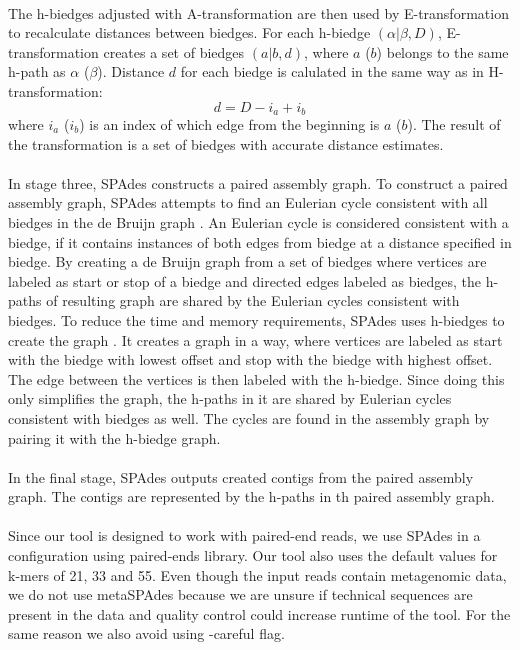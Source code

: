 \paragraph*{}
The h-biedges adjusted with A-transformation are then used by E-transformation to recalculate distances between biedges. For each h-biedge $(\alpha|\beta,D)$, E-transformation creates a set of biedges $(a|b,d)$, where $a$ ($b$) belongs to the same h-path as $\alpha$ ($\beta$). Distance $d$ for each biedge is calulated in the same way as in H-transformation:
\[ d = D - i_{a} + i_{b} \]
where $i_{a}$ ($i_{b}$) is an index of which edge from the beginning is $a$ ($b$). The result of the transformation is a set of biedges with accurate distance estimates.
\paragraph*{}
In stage three, SPAdes constructs a paired assembly graph. To construct a paired assembly graph, SPAdes attempts to find an Eulerian cycle consistent with all biedges in the de Bruijn graph \cite{bankevich2012spades}. An Eulerian cycle is considered consistent with a biedge, if it contains instances of both edges from biedge at a distance specified in biedge. By creating a de Bruijn graph from a set of biedges where vertices are labeled as start or stop of a biedge and directed edges labeled as biedges, the h-paths of resulting graph are shared by the Eulerian cycles consistent with biedges. To reduce the time and memory requirements, SPAdes uses h-biedges to create the graph \cite{bankevich2012spades}. It creates a graph in a way, where vertices are labeled as start with the biedge with lowest offset and stop with the biedge with highest offset. The edge between the vertices is then labeled with the h-biedge. Since doing this only simplifies the graph, the h-paths in it are shared by Eulerian cycles consistent with biedges as well. The cycles are found in the assembly graph by pairing it with the h-biedge graph.
\paragraph*{}
In the final stage, SPAdes outputs created contigs from the paired assembly graph. The contigs are represented by the h-paths in th paired assembly graph.
\paragraph*{}
Since our tool is designed to work with paired-end reads, we use SPAdes in a configuration using paired-ends library. Our tool also uses the default values for k-mers of 21, 33 and 55. Even though the input reads contain metagenomic data, we do not use metaSPAdes because we are unsure if technical sequences are present in the data and quality control could increase runtime of the tool. For the same reason we also avoid using -careful flag.

